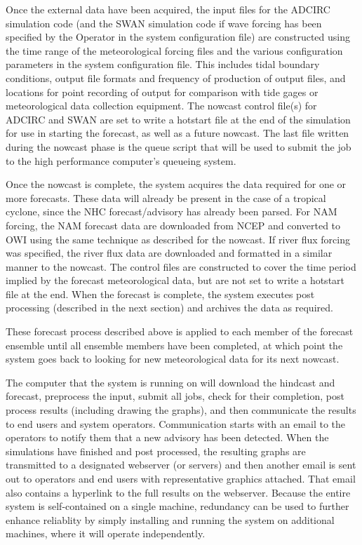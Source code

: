 \documentclass[jmse,article,submit,moreauthors,pdftex,12pt,a4paper]{mdpi}
\begin{document}
Once the external data have been acquired, the input files for the 
ADCIRC simulation code (and the SWAN simulation code if wave forcing 
has been specified by the Operator in the system configuration file) 
are constructed using the time range of the meteorological forcing 
files and the various configuration parameters in the system 
configuration file. This includes tidal boundary conditions, output 
file formats and frequency of production of output files, and 
locations for point recording of output for comparison with tide 
gages or meteorological data collection equipment. The nowcast 
control file(s) for ADCIRC and SWAN are set to write a hotstart file 
at the end of the simulation for use in starting the forecast, as 
well as a future nowcast. The last file written during the nowcast 
phase is the queue script that will be used to submit the job to the 
high performance computer's queueing system.

Once the nowcast is complete, the system acquires the data required 
for one or more forecasts. These data will already be present in the 
case of a tropical cyclone, since the NHC forecast/advisory has 
already been parsed. For NAM forcing, the NAM forecast data are 
downloaded from NCEP and converted to OWI using the same technique 
as described for the nowcast. If river flux forcing was specified, 
the river flux data are downloaded and formatted in a similar manner 
to the nowcast. The control files are constructed to cover the time 
period implied by the forecast meteorological data, but are not set 
to write a hotstart file at the end. When the forecast is complete, 
the system executes post processing (described in the next section) 
and archives the data as required. 

These forecast process described above is applied to  each member of 
the forecast ensemble until all ensemble members have been 
completed, at which point the system goes back to looking for new 
meteorological data for its next nowcast.

The computer that the system is running on will download the 
hindcast and forecast, preprocess the input, submit all jobs, check 
for their completion, post process results (including drawing the 
graphs), and then communicate the results to end users and system 
operators. Communication starts with an email to the operators to 
notify them that a new advisory has been detected. When the 
simulations have finished and post processed, the resulting graphs 
are transmitted to a designated webserver (or servers) and then 
another email is sent out to operators and end users with 
representative graphics attached. That email also contains a 
hyperlink to the full results on the webserver. Because the entire 
system is self-contained on a single machine, redundancy can be used 
to further enhance reliablity by simply installing and running the 
system on additional machines, where it will operate independently. 
\end{document}
